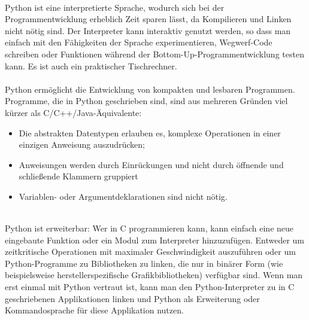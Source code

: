 \\
Python ist eine interpretierte Sprache, wodurch sich bei der Programmentwicklung erheblich Zeit sparen lässt, da Kompilieren und Linken nicht nötig sind. Der Interpreter kann interaktiv genutzt werden, so dass man einfach mit den Fähigkeiten der Sprache experimentieren, Wegwerf-Code schreiben oder Funktionen während der Bottom-Up-Programmentwicklung testen kann. Es ist auch ein praktischer Tischrechner.\\
\\
Python ermöglicht die Entwicklung von kompakten und lesbaren Programmen. Programme, die in Python geschrieben sind, sind aus mehreren Gründen viel kürzer als C/C++/Java-Äquivalente:\\

\begin{itemize}
\item Die abstrakten Datentypen erlauben es, komplexe Operationen in einer einzigen Anweisung auszudrücken;
\item Anweisungen werden durch Einrückungen und nicht durch öffnende und schließende Klammern gruppiert
\item Variablen- oder Argumentdeklarationen sind nicht nötig.
\end{itemize}
\ \\
Python ist erweiterbar: Wer in C programmieren kann, kann einfach eine neue eingebaute Funktion oder ein Modul zum Interpreter hinzuzufügen. Entweder um zeitkritische Operationen mit maximaler Geschwindigkeit auszuführen oder um Python-Programme zu Bibliotheken zu linken, die nur in binärer Form (wie beispielsweise herstellerspezifische Grafikbibliotheken) verfügbar sind. Wenn man erst einmal mit Python vertraut ist, kann man den Python-Interpreter zu in C geschriebenen Applikationen linken und Python als Erweiterung oder Kommandosprache für diese Applikation nutzen.\\

